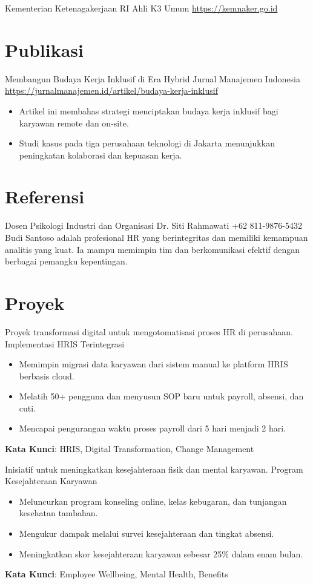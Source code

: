 \documentclass[a4paper, serif, 10pt]{moderncv}
\begin{document}
        {Kementerian Ketenagakerjaan RI}
        {Ahli K3 Umum}
        {\url{https://kemnaker.go.id}}
        {}
        {}
\section{Publikasi}

        {Membangun Budaya Kerja Inklusif di Era Hybrid}
        {Jurnal Manajemen Indonesia}
        {\url{https://jurnalmanajemen.id/artikel/budaya-kerja-inklusif}}
        {}
        {\begin{itemize}
\item Artikel ini membahas strategi menciptakan budaya kerja inklusif bagi karyawan remote dan on-site.
\item Studi kasus pada tiga perusahaan teknologi di Jakarta menunjukkan peningkatan kolaborasi dan kepuasan kerja.
\end{itemize}}
\section{Referensi}

        {Dosen Psikologi Industri dan Organisasi}
        {Dr. Siti Rahmawati}
        {+62 811-9876-5432}
        {}
        {Budi Santoso adalah profesional HR yang berintegritas dan memiliki kemampuan analitis yang kuat. Ia mampu memimpin tim dan berkomunikasi efektif dengan berbagai pemangku kepentingan.}
\section{Proyek}

        {Proyek transformasi digital untuk mengotomatisasi proses HR di perusahaan.}
        {Implementasi HRIS Terintegrasi}
        {}
        {}
        {\begin{itemize}
\item Memimpin migrasi data karyawan dari sistem manual ke platform HRIS berbasis cloud.
\item Melatih 50+ pengguna dan menyusun SOP baru untuk payroll, absensi, dan cuti.
\item Mencapai pengurangan waktu proses payroll dari 5 hari menjadi 2 hari.
\end{itemize}
\textbf{Kata Kunci}: HRIS, Digital Transformation, Change Management}

        {Inisiatif untuk meningkatkan kesejahteraan fisik dan mental karyawan.}
        {Program Kesejahteraan Karyawan}
        {}
        {}
        {\begin{itemize}
\item Meluncurkan program konseling online, kelas kebugaran, dan tunjangan kesehatan tambahan.
\item Mengukur dampak melalui survei kesejahteraan dan tingkat absensi.
\item Meningkatkan skor kesejahteraan karyawan sebesar 25\% dalam enam bulan.
\end{itemize}
\textbf{Kata Kunci}: Employee Wellbeing, Mental Health, Benefits}
\end{document}
